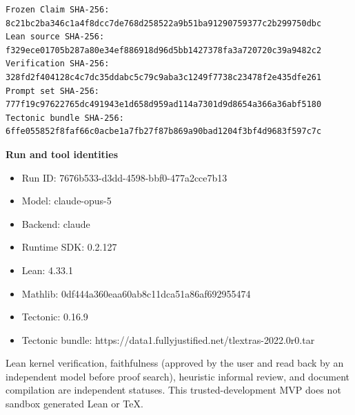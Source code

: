 \documentclass[11pt]{article}
\begin{document}
\begin{Verbatim}[fontsize=\small]
Frozen Claim SHA-256: 8c21bc2ba346c1a4f8dcc7de768d258522a9b51ba91290759377c2b299750dbc
Lean source SHA-256: f329ece01705b287a80e34ef886918d96d5bb1427378fa3a720720c39a9482c2
Verification SHA-256: 328fd2f404128c4c7dc35ddabc5c79c9aba3c1249f7738c23478f2e435dfe261
Prompt set SHA-256: 777f19c97622765dc491943e1d658d959ad114a7301d9d8654a366a36abf5180
Tectonic bundle SHA-256: 6ffe055852f8faf66c0acbe1a7fb27f87b869a90bad1204f3bf4d9683f597c7c
\end{Verbatim}

\begin{samepage}
\textbf{Run and tool identities}
\begin{itemize}
\item Run ID: 7676b533-d3dd-4598-bbf0-477a2cce7b13
\item Model: claude-opus-5
\item Backend: claude
\item Runtime SDK: 0.2.127
\item Lean: 4.33.1
\item Mathlib: 0df444a360eaa60ab8c11dca51a86af692955474
\item Tectonic: 0.16.9
\item Tectonic bundle: https://data1.fullyjustified.net/tlextras-2022.0r0.tar
\end{itemize}
\end{samepage}

\vfill
\small
Lean kernel verification, faithfulness (approved by the user and read back by an
independent model before proof search), heuristic informal review, and document
compilation are independent statuses. This trusted-development MVP
does not sandbox generated Lean or TeX.
\end{document}
